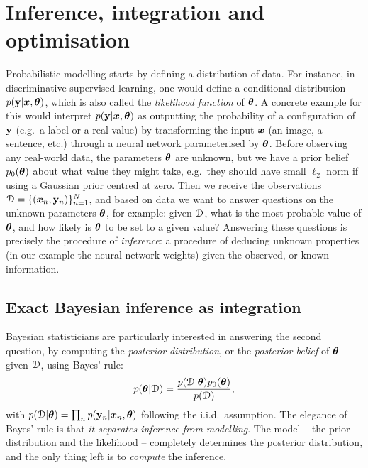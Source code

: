\section{Inference, integration and optimisation}
\label{sec:approx_inference}
Probabilistic modelling starts by defining a distribution of data. For instance, in discriminative supervised learning, one would define a conditional distribution $p(\mathbf{y} | \bm{x}, \bm{\theta})$, which is also called the \emph{likelihood function} of $\bm{\theta}$. A concrete example for this would interpret $p(\mathbf{y} | \bm{x}, \bm{\theta})$ as outputting the probability of a configuration of $\mathbf{y}$ (e.g.~a label or a real value) by transforming the input $\bm{x}$ (an image, a sentence, etc.) through a neural network parameterised by $\bm{\theta}$. Before observing any real-world data, the parameters $\bm{\theta}$ are unknown, but we have a prior belief $p_0(\bm{\theta})$ about what value they might take, e.g.~they should have small $\ell_2$ norm if using a Gaussian prior centred at zero. Then we receive the observations $\mathcal{D} = \{ (\bm{x}_n, \mathbf{y}_n) \}_{n=1}^N$, and based on data we want to answer questions on the unknown parameters $\bm{\theta}$, for example: given $\mathcal{D}$, what is the most probable value of $\bm{\theta}$, and how likely is $\bm{\theta}$ to be set to a given value? Answering these questions is precisely the procedure of \emph{inference}: a procedure of deducing unknown properties (in our example the neural network weights) given the observed, or known information. 
%

\subsection{Exact Bayesian inference as integration}
Bayesian statisticians are particularly interested in answering the second question, by computing the \emph{posterior distribution}, or the \emph{posterior belief} of $\bm{\theta}$ given $\mathcal{D}$, using Bayes' rule:
\begin{equation}
p(\bm{\theta} | \mathcal{D}) = \frac{p(\mathcal{D} | \bm{\theta}) p_0(\bm{\theta})}{p(\mathcal{D})},
\label{eq:chap1_bayes_rule}
\end{equation}
with $p(\mathcal{D} | \bm{\theta}) = \prod_{n} p(\mathbf{y}_n | \bm{x}_n, \bm{\theta})$ following the i.i.d.~assumption. The elegance of Bayes' rule is that \emph{it separates inference from modelling}. The model -- the prior distribution and the likelihood -- completely determines the posterior distribution, and the only thing left is to \emph{compute} the inference.
%

